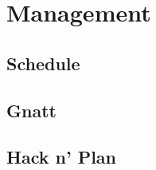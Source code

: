 
\section{Management}

\subsection{Schedule}

\subsection{Gnatt}

\subsection{Hack n' Plan}

\newpage